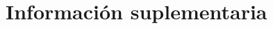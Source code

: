 \documentclass[fleqn,11pt]{SelfArx}
\begin{document}
{}



\onecolumn
\section{Informaci\'on suplementaria}\label{sec: complementaria}
\end{document}
